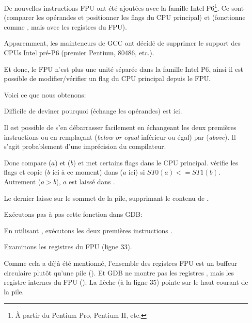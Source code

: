 \label{gcc481_o3}

De nouvelles instructions FPU ont été ajoutées avec la famille Intel P6\footnote{À partir du Pentium Pro, Pentium-II, etc.}.
Ce sont  (comparer les opérandes et positionner les flags du CPU principal)
et 
 (fonctionne comme , mais avec les registres du FPU).

Apparemment, les mainteneurs de GCC ont décidé de supprimer le support des CPUs Intel
pré-P6 (premier Pentium, 80486, etc.).

Et donc, le FPU n'est plus une unité séparée dans la famille Intel P6, ainsi il est
possible de modifier/vérifier un flag du CPU principal depuis le FPU.

Voici ce que nous obtenons:



Difficile de deviner pourquoi  (échange les opérandes) est ici.

Il est possible de s'en débarrasser facilement en échangeant les deux premières instructions
\FLD ou en remplaçant  (\emph{below or equal} inférieur ou égal) par
 (\emph{above}).
Il s'agit probablement d'une imprécision du compilateur.

Donc  compare  ($a$) et  ($b$) et met certains flags
dans le CPU principal.
 vérifie les flags et copie  ($b$ ici à ce moment) dans 
($a$ ici) si $ST0 (a) <= ST1 (b)$.
Autrement ($a>b$), $a$ est laissé dans .

Le dernier \FSTP laisse  sur le sommet de la pile, supprimant le contenu de .

Exécutons pas à pas cette fonction dans GDB:



En utilisant , exécutons les deux premières instructions \FLD.

Examinons les registres du FPU (ligne 33).

Comme cela a déjà été mentionné, l'ensemble des registres FPU est un buffeur
circulaire plutôt qu'une pile ().
Et GDB ne montre pas les registres , mais les registre internes du FPU ().
La flèche (à la ligne 35) pointe sur le haut courant de la pile.

